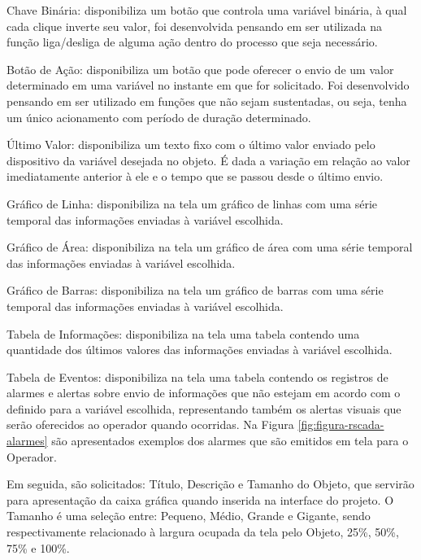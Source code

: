 \begin{alineascomponto}
    \item Chave Binária: disponibiliza um botão que controla uma variável binária, à qual cada clique inverte seu valor, foi desenvolvida pensando em ser utilizada na função liga/desliga de alguma ação dentro do processo que seja necessário.
    \item Botão de Ação: disponibiliza um botão que pode oferecer o envio de um valor determinado em uma variável no instante em que for solicitado. Foi desenvolvido pensando em ser utilizado em funções que não sejam sustentadas, ou seja, tenha um único acionamento com período de duração determinado.
    \item Último Valor: disponibiliza um texto fixo com o último valor enviado pelo dispositivo da variável desejada no objeto. É dada a variação em relação ao valor imediatamente anterior à ele e o tempo que se passou desde o último envio.
    \item Gráfico de Linha: disponibiliza na tela um gráfico de linhas com uma série temporal das informações enviadas à variável escolhida. 
    \item Gráfico de Área: disponibiliza na tela um gráfico de área com uma série temporal das informações enviadas à variável escolhida.
    \item Gráfico de Barras: disponibiliza na tela um gráfico de barras com uma série temporal das informações enviadas à variável escolhida.
    \item Tabela de Informações: disponibiliza na tela uma tabela contendo uma quantidade dos últimos valores das informações enviadas à variável escolhida.
    \item Tabela de Eventos:  disponibiliza na tela uma tabela contendo os registros de alarmes e alertas sobre envio de informações que não estejam em acordo com o definido para a variável escolhida, representando também os alertas visuais que serão oferecidos ao operador quando ocorridas. Na Figura \ref{fig:figura-rscada-alarmes} são apresentados exemplos dos alarmes que são emitidos em tela para o Operador.
\end{alineascomponto}

Em seguida, são solicitados: Título, Descrição e Tamanho do Objeto, que servirão para apresentação da caixa gráfica quando inserida na interface do projeto. O Tamanho é uma seleção entre: Pequeno, Médio, Grande e Gigante, sendo respectivamente relacionado à largura ocupada da tela pelo Objeto, 25\%, 50\%, 75\% e 100\%.

